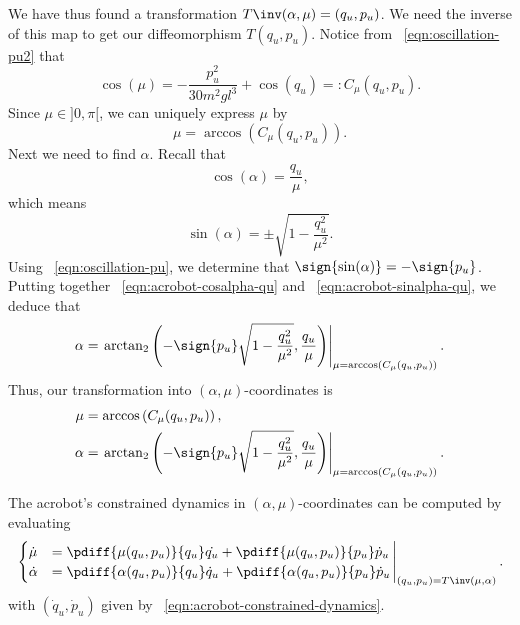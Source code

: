 We have thus found a transformation \(T\inv(\alpha,\mu) = (q_u,p_u)\).
We need the inverse of this map to get our diffeomorphism \(T(q_u,p_u)\).
Notice from ~\eqref{eqn:oscillation-pu2} that
\[
    \cos(\mu) = -\frac{p_u^2}{30m^2gl^3} + \cos(q_u) =: C_\mu(q_u,p_u)
    .
\]
Since \(\mu \in ]0,\pi[\), we can uniquely express \(\mu\) by
\begin{equation*}
    \mu = \arccos\left(C_\mu(q_u,p_u)\right)
    .
\end{equation*}
Next we need to find \(\alpha\). 
Recall that 
\begin{equation}\label{eqn:acrobot-cosalpha-qu}
    \cos(\alpha) = \frac{q_u}{\mu}
    ,
\end{equation}
which means 
\begin{equation}\label{eqn:acrobot-sinalpha-qu}
    \sin(\alpha) = \pm \sqrt{1 - \frac{q_u^2}{\mu^2}}
    .
\end{equation}
Using ~\eqref{eqn:oscillation-pu}, we determine that
\(\sign{\sin(\alpha)} = -\sign{p_u}\).
Putting together ~\eqref{eqn:acrobot-cosalpha-qu} and
~\eqref{eqn:acrobot-sinalpha-qu}, we deduce that
\begin{equation*}
    \alpha = \left.
        \arctan_2\left( -\sign{p_u}\sqrt{1 - \frac{q_u^2}{\mu^2}}, \frac{q_u}{\mu}\right)
        \right|_{\mu = \arccos(C_\mu(q_u,p_u))}
    .
\end{equation*}
Thus, our transformation into \((\alpha,\mu)\)-coordinates is
\begin{align}
        \label{eqn:mu-qupu}
        \mu &= \arccos\left(C_\mu(q_u,p_u)\right), \\
        \label{eqn:alpha-qupu}
        \alpha &= \left.
        \arctan_2\left( -\sign{p_u}\sqrt{1 - \frac{q_u^2}{\mu^2}}, \frac{q_u}{\mu}\right)
        \right|_{\mu = \arccos(C_\mu(q_u,p_u))}
        .
\end{align}

The acrobot's constrained dynamics in
\((\alpha,\mu)\)-coordinates can be computed by evaluating
\begin{equation*}
\left.\begin{cases}
    \dot{\mu} &= \pdiff{\mu(q_u,p_u)}{q_u}\dot{q_u} +
         \pdiff{\mu(q_u,p_u)}{p_u}\dot{p}_u
    \\
    \dot{\alpha} &= \pdiff{\alpha(q_u,p_u)}{q_u}\dot{q}_u + 
        \pdiff{\alpha(q_u,p_u)}{p_u}\dot{p}_u
    \end{cases}\right|_{(q_u,p_u) = T\inv(\mu,\alpha)}
    .
\end{equation*}
with \((\dot{q}_u,\dot{p}_u)\) given by 
 ~\eqref{eqn:acrobot-constrained-dynamics}.

